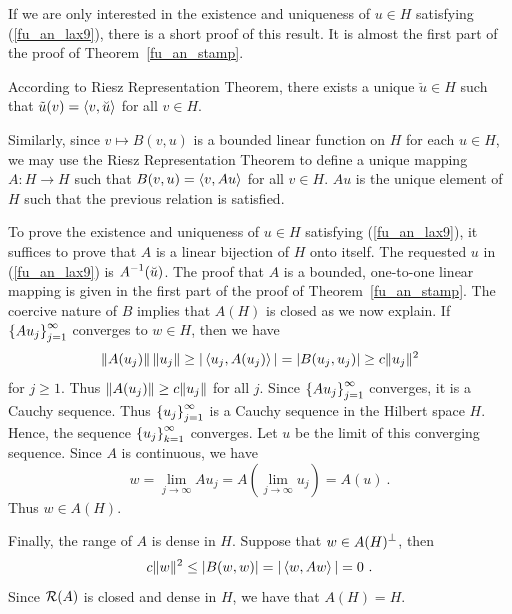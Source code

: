 \begin{rmk}
If we are only interested in the existence and uniqueness of $u\in H$
satisfying (\ref{fu_an_lax9}), there is a short proof of this result.
It is almost the first part of the proof of Theorem~\ref{fu_an_stamp}.
\label{fu_an_LaxMilgTh1}

According to Riesz Representation Theorem, there
exists a unique $\breve{u} \in H$ such that
$\displaystyle \tilde{u}(v) = \left\langle{v} , {\breve{u}}\right\rangle$ for all $v \in H$.

Similarly, since $v \mapsto B(v,u)$ is a bounded linear function on
$H$ for each $u\in H$, we may use the Riesz Representation Theorem
to define a unique mapping $A:H \rightarrow H$ such that
$\displaystyle B(v,u) = \left\langle{v} , {Au}\right\rangle$ for all $v \in H$.
$Au$ is the unique element of $H$ such that the previous relation is
satisfied.

To prove the existence and uniqueness of $u\in H$ satisfying
(\ref{fu_an_lax9}), it suffices to prove that $A$ is a linear bijection of
$H$ onto itself.  The requested $u$ in (\ref{fu_an_lax9}) is
$\displaystyle A^{-1}(\breve{u})$.  The proof that $A$ is a bounded, one-to-one
linear mapping is given in the first part of the proof of
Theorem~\ref{fu_an_stamp}.  The coercive nature of $B$ implies that
$A(H)$ is closed as we now explain.  If
$\displaystyle \left\{A u_j\right\}_{j=1}^\infty$ converges to
$w\in H$, then we have
\[
\|A(u_j)\|\,\|u_j\| \geq |\left\langle{u_j} , {A(u_j)}\right\rangle| = |B(u_j,u_j)| \geq c
\|u_j\|^2
\]
for $j \geq 1$.
Thus $\displaystyle \|A(u_j)\| \geq c \|u_j\|$ for all $j$.  Since 
$\displaystyle \left\{A u_j\right\}_{j=1}^\infty$ converges, it is a
Cauchy sequence.  Thus
$\displaystyle \left\{u_j\right\}_{j=1}^\infty$ is a Cauchy sequence 
in the Hilbert space $H$.  Hence, the sequence
$\displaystyle \left\{u_j\right\}_{k=1}^\infty$ converges.  Let $u$ be the
limit of this converging sequence.  Since $A$ is continuous, we have
\[
w = \lim_{j\rightarrow \infty} A u_{j}
= A\left( \lim_{j\rightarrow \infty} u_j\right) = A(u) \  .
\]
Thus $w \in A(H)$.

Finally, the range of $A$ is dense in $H$.  Suppose that
$\displaystyle w \in A(H)^\perp$,
then
\[
c \|w\|^2 \leq |B(w,w)| = |\left\langle{w} , {Aw}\right\rangle| = 0 \  .
\]
Since $\mathcal{R}(A)$ is closed and dense in $H$, we have that $A(H)=H$.
\end{rmk}

